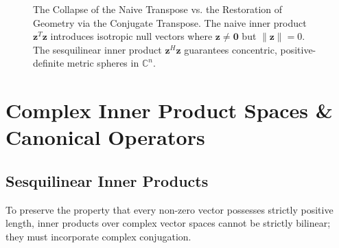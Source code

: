 \begin{figure}[htbp]
\caption{The Collapse of the Naive Transpose vs. the Restoration of Geometry via the Conjugate Transpose. The naive inner product $\mathbf{z}^T \mathbf{z}$ introduces isotropic null vectors where $\mathbf{z} \ne \mathbf{0}$ but $\|\mathbf{z}\| = 0$. The sesquilinear inner product $\mathbf{z}^H \mathbf{z}$ guarantees concentric, positive-definite metric spheres in $\mathbb{C}^n$.}
\label{fig:complex_metric_rescue}
\end{figure}

\section{Complex Inner Product Spaces \& Canonical Operators}

\subsection{Sesquilinear Inner Products}
To preserve the property that every non-zero vector possesses strictly positive length, inner products over complex vector spaces cannot be strictly bilinear; they must incorporate complex conjugation.

